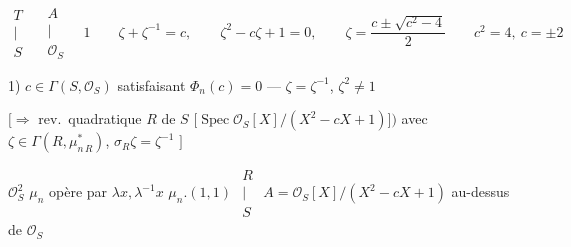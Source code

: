 \documentclass[11pt,a4paper]{article}
\begin{document}


\[
\begin{array}{c} T \\ | \\ S \end{array} \quad \begin{array}{c} A \\ | \\ \mathcal{O}_S \end{array} \quad 1
\qquad
\zeta + \zeta^{-1} = c, \qquad \zeta^2 - c\zeta + 1 = 0, \qquad \zeta = \frac{c \pm \sqrt{c^2-4}}{2} \qquad c^2 = 4,\ c = \pm 2
\]

1) $c \in \Gamma(S, \mathcal{O}_S)$ satisfaisant $\Phi_n(c) = 0$ --- $\zeta = \zeta^{-1}$, $\zeta^2 \neq 1$

\quad $\bigl[\Rightarrow$ rev.\ quadratique $R$ de $S$ $\bigl[\operatorname{Spec} \mathcal{O}_S[X]/(X^2 - cX + 1)\bigr]\bigr)$ avec \struck{\ill{}} $\zeta \in \Gamma(R, \mu^{*}_{n\,R})$, $\sigma_R\zeta = \zeta^{-1}$ $\bigr]$


$\mathcal{O}_S^2$ \quad $\mu_n$ opère par $\lambda x, \lambda^{-1} x$ \quad $\mu_n.(1,1)$ \qquad $\begin{array}{c} R \\ | \\ S \end{array}$ \quad $A = \mathcal{O}_S[X]/(X^2 - cX + 1)$ au-dessus de $\mathcal{O}_S$
\end{document}
